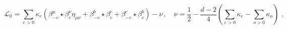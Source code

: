 \begin{equation}
{\mathcal{L}_{0}}=\sum_{e>0}\kappa _{e}\left( \beta _{-e}^{\mu }\star \beta
_{e}^{\nu }\eta _{\mu \nu }+\beta _{-e}^{b}\star \beta _{e}^{c}+\beta
_{-e}^{c}\star \beta _{e}^{b}\right) -\nu \,,\quad \nu =\frac{1}{2}-\frac{d-2%
}{4}(\sum_{e>0}\kappa _{e}-\sum_{o>0}\kappa _{o})\,\,,  \label{nu_and_cL}
\end{equation}%
